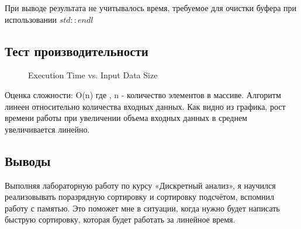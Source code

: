 \documentclass[12pt]{article}
\begin{document}
При выводе результата не учитывалось время, требуемое для очистки буфера при использовании 
$std::endl$

\subsection*{Тест производительности}

\begin{figure}
\centering
{}
\caption{Execution Time vs. Input Data Size}
\end{figure}


Оценка сложности: O(n) где , n - количество элементов в массиве.
Алгоритм линеен относительно количества входных данных.
Как видно из графика, рост времени работы при увеличении объема входных данных
в среднем увеличивается линейно.

\subsection*{Выводы}

Выполняя лабораторную работу по курсу «Дискретный анализ», я научился реализовывать 
поразрядную сортировку и сортировку подсчётом,
вспомнил работу с памятью. Это поможет мне в ситуации, когда нужно будет написать
быструю сортировку, которая будет работать за линейное время. 
\end{document}
